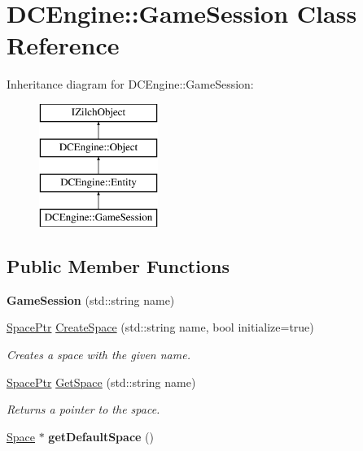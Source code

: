 \hypertarget{classDCEngine_1_1GameSession}{\section{D\-C\-Engine\-:\-:Game\-Session Class Reference}
\label{classDCEngine_1_1GameSession}
}
Inheritance diagram for D\-C\-Engine\-:\-:Game\-Session\-:\begin{figure}[H]
\begin{center}
\leavevmode
\includegraphics[height=4.000000cm]{classDCEngine_1_1GameSession}
\end{center}
\end{figure}
\subsection*{Public Member Functions}
\begin{DoxyCompactItemize}
\item 
\hypertarget{classDCEngine_1_1GameSession_a76691b83f160bcde3b3c9a0282d48238}{{\bfseries Game\-Session} (std\-::string name)}\label{classDCEngine_1_1GameSession_a76691b83f160bcde3b3c9a0282d48238}

\item 
\hyperlink{classDCEngine_1_1Space}{Space\-Ptr} \hyperlink{classDCEngine_1_1GameSession_a278eae00e9020e42a623aa6cad30fe7e}{Create\-Space} (std\-::string name, bool initialize=true)
\begin{DoxyCompactList}\small\item\em Creates a space with the given name. \end{DoxyCompactList}\item 
\hyperlink{classDCEngine_1_1Space}{Space\-Ptr} \hyperlink{classDCEngine_1_1GameSession_a388fa88873967f2303fd7383d1371a0f}{Get\-Space} (std\-::string name)
\begin{DoxyCompactList}\small\item\em Returns a pointer to the space. \end{DoxyCompactList}\item 
\hypertarget{classDCEngine_1_1GameSession_a5d33a813f77dae35d324115db4f2096b}{\hyperlink{classDCEngine_1_1Space}{Space} $\ast$ {\bfseries get\-Default\-Space} ()}\label{classDCEngine_1_1GameSession_a5d33a813f77dae35d324115db4f2096b}

\end{DoxyCompactItemize}
